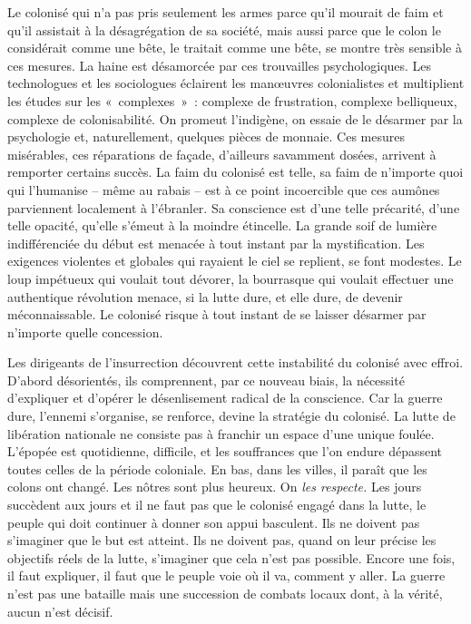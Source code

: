 \documentclass[french,twoside]{book} %
\begin{document}
\noindent Le colonisé qui n’a pas pris seulement les armes parce qu’il mourait de faim et qu’il assistait à la désagrégation de sa société, mais aussi parce que le colon le considérait comme une bête, le traitait comme une bête, se montre très sensible à ces mesures. La haine est désamorcée par ces trouvailles psychologiques. Les technologues et les sociologues éclairent les manœuvres colonialistes et multiplient les études sur les « complexes » : complexe de frustration, complexe belliqueux, complexe de colonisabilité. On promeut l’indigène, on essaie de le désarmer par la psychologie et, naturellement, quelques pièces de monnaie.   Ces mesures misérables, ces réparations de façade, d’ailleurs savamment dosées, arrivent à remporter certains succès. La faim du colonisé est telle, sa faim de n’importe quoi qui l’humanise – même au rabais – est à ce point incoercible que ces aumônes parviennent localement à l’ébranler. Sa conscience est d’une telle précarité, d’une telle opacité, qu’elle s’émeut à la moindre étincelle. La grande soif de lumière indifférenciée du début est menacée à tout instant par la mystification. Les exigences violentes et globales qui rayaient le ciel se replient, se font modestes. Le loup impétueux qui voulait tout dévorer, la bourrasque qui voulait effectuer une authentique révolution menace, si la lutte dure, et elle dure, de devenir méconnaissable. Le colonisé risque à tout instant de se laisser désarmer par n’importe quelle concession.\par
Les dirigeants de l’insurrection découvrent cette instabilité du colonisé avec effroi. D’abord désorientés, ils comprennent, par ce nouveau biais, la nécessité d’expliquer et d’opérer le désenlisement radical de la conscience. Car la guerre dure, l’ennemi s’organise, se renforce, devine la stratégie du colonisé. La lutte de libération nationale ne consiste pas à franchir un espace d’une unique foulée. L’épopée est quotidienne, difficile, et les souffrances que l’on endure dépassent toutes celles de la période coloniale. En bas, dans les villes, il paraît que les colons ont changé. Les nôtres sont plus heureux. On \emph{les respecte.} Les jours succèdent aux jours et il ne faut pas que le colonisé engagé dans la lutte, le peuple qui doit continuer à donner son appui basculent. Ils ne doivent pas s’imaginer que le but est atteint. Ils ne doivent pas, quand on leur précise les objectifs réels de la lutte, s’imaginer que cela n’est pas possible. Encore une fois, il faut expliquer, il faut que le peuple voie où il va, comment y aller. La guerre n’est pas une bataille mais une succession de combats locaux dont, à la vérité, aucun n’est décisif.\par
\end{document}
